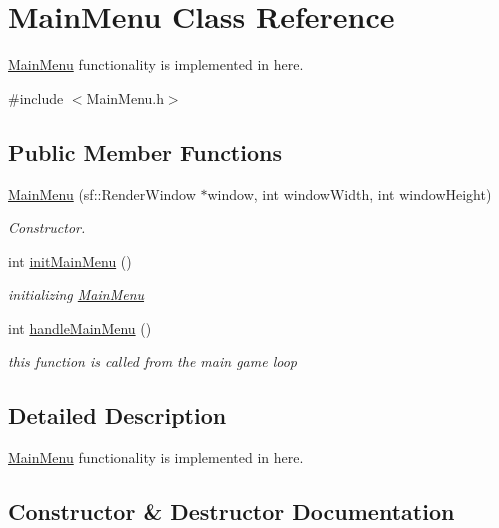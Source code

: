 \hypertarget{classMainMenu}{}\section{Main\+Menu Class Reference}
\label{classMainMenu}


\hyperlink{classMainMenu}{Main\+Menu} functionality is implemented in here.  




{\ttfamily \#include $<$Main\+Menu.\+h$>$}

\subsection*{Public Member Functions}
\begin{DoxyCompactItemize}
\item 
\hyperlink{classMainMenu_af2637271af09e0d24b15664f6301f723}{Main\+Menu} (sf\+::\+Render\+Window $\ast$window, int window\+Width, int window\+Height)
\begin{DoxyCompactList}\small\item\em Constructor. \end{DoxyCompactList}\item 
int \hyperlink{classMainMenu_a3c15af2faff50d642ab6920e2fdcd297}{init\+Main\+Menu} ()
\begin{DoxyCompactList}\small\item\em initializing \hyperlink{classMainMenu}{Main\+Menu} \end{DoxyCompactList}\item 
int \hyperlink{classMainMenu_ab849dbe0f56adfed51f58e80a536c5f8}{handle\+Main\+Menu} ()
\begin{DoxyCompactList}\small\item\em this function is called from the main game loop \end{DoxyCompactList}\end{DoxyCompactItemize}


\subsection{Detailed Description}
\hyperlink{classMainMenu}{Main\+Menu} functionality is implemented in here. 

\subsection{Constructor \& Destructor Documentation}
\mbox{\label{classMainMenu_af2637271af09e0d24b15664f6301f723}} 
